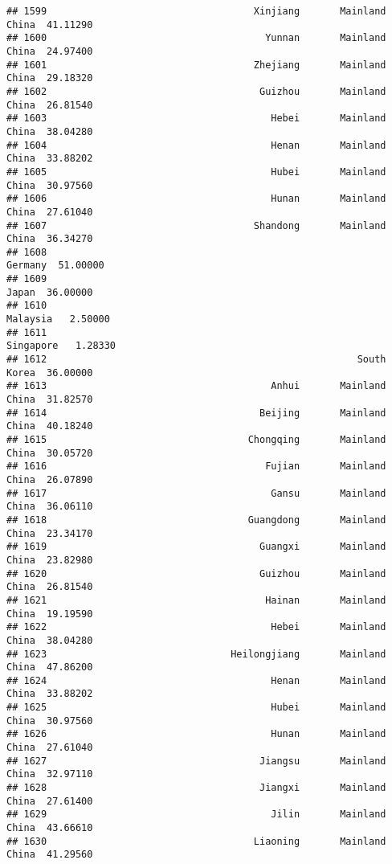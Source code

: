 \documentclass[
]{article}
\begin{document}
\begin{verbatim}
## 1599                                    Xinjiang       Mainland China  41.11290
## 1600                                      Yunnan       Mainland China  24.97400
## 1601                                    Zhejiang       Mainland China  29.18320
## 1602                                     Guizhou       Mainland China  26.81540
## 1603                                       Hebei       Mainland China  38.04280
## 1604                                       Henan       Mainland China  33.88202
## 1605                                       Hubei       Mainland China  30.97560
## 1606                                       Hunan       Mainland China  27.61040
## 1607                                    Shandong       Mainland China  36.34270
## 1608                                                          Germany  51.00000
## 1609                                                            Japan  36.00000
## 1610                                                         Malaysia   2.50000
## 1611                                                        Singapore   1.28330
## 1612                                                      South Korea  36.00000
## 1613                                       Anhui       Mainland China  31.82570
## 1614                                     Beijing       Mainland China  40.18240
## 1615                                   Chongqing       Mainland China  30.05720
## 1616                                      Fujian       Mainland China  26.07890
## 1617                                       Gansu       Mainland China  36.06110
## 1618                                   Guangdong       Mainland China  23.34170
## 1619                                     Guangxi       Mainland China  23.82980
## 1620                                     Guizhou       Mainland China  26.81540
## 1621                                      Hainan       Mainland China  19.19590
## 1622                                       Hebei       Mainland China  38.04280
## 1623                                Heilongjiang       Mainland China  47.86200
## 1624                                       Henan       Mainland China  33.88202
## 1625                                       Hubei       Mainland China  30.97560
## 1626                                       Hunan       Mainland China  27.61040
## 1627                                     Jiangsu       Mainland China  32.97110
## 1628                                     Jiangxi       Mainland China  27.61400
## 1629                                       Jilin       Mainland China  43.66610
## 1630                                    Liaoning       Mainland China  41.29560

\end{verbatim}
\end{document}
